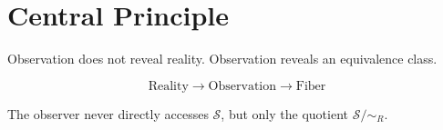 \documentclass[11pt]{amsart}
\begin{document}
\section{Central Principle}

Observation does not reveal reality.
Observation reveals an equivalence class.

\[
\boxed{
\text{Reality}
\longrightarrow
\text{Observation}
\longrightarrow
\text{Fiber}
}
\]

The observer never directly accesses $\mathcal{S}$, but only the quotient
$\mathcal{S} / {\sim_R}$.

\end{document}
